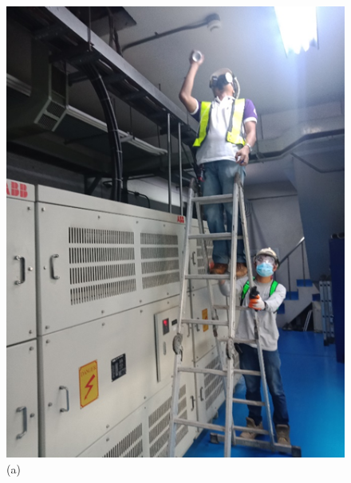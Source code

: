 \begin{figure}[h]
	\begin{minipage}[b]{0.22\linewidth}
		\centering
		\includegraphics[width=\textwidth]{figures/ch02_fdas01}
		\caption*{(a)}
	\end{minipage}
	\hspace{0.05cm}
	\begin{minipage}[b]{0.22\linewidth}
		\centering

\end{minipage}
\end{figure}
